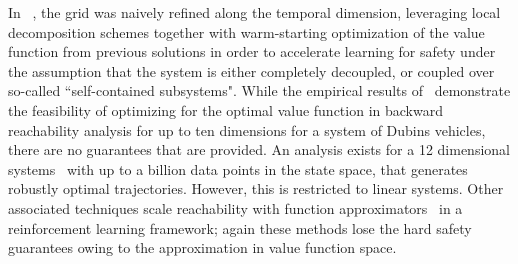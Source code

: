In ~\cite{SylviaScalability}, the grid was naively refined along the temporal dimension, leveraging local decomposition schemes together with warm-starting optimization of the value function from previous solutions in order to accelerate learning for safety under the assumption that the system is either completely decoupled, or coupled over so-called ``self-contained subsystems".  While the empirical results of~\cite{Bansal} demonstrate the feasibility of optimizing for the optimal value function in backward reachability analysis for up to ten dimensions for a system of Dubins vehicles, there are no guarantees that are provided. An analysis exists for a 12 dimensional systems~\cite{KaynamaScalable} with up to a billion data points in the state space, that generates robustly optimal trajectories. However, this is restricted to {linear systems}. Other associated techniques scale reachability with function approximators~\cite{FisacTAC, FisacICRA} in a reinforcement learning framework; again these methods lose the hard safety guarantees owing to the approximation in value function space.  


